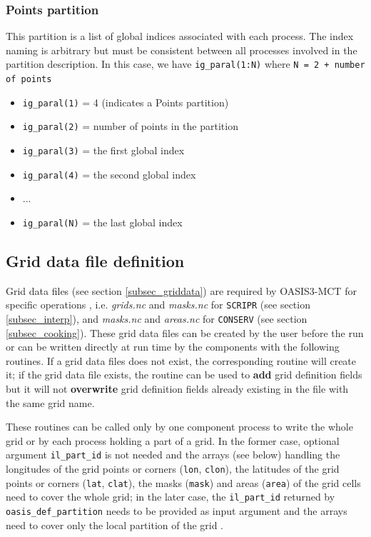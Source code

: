 \subsubsection{Points partition}

This partition is a list of global indices associated with each
process.  The index naming
is arbitrary but must be consistent between all processes involved
in the partition description.  In
this case, we have {\tt ig\_paral(1:N)} where {\tt N = 2 + number of
  points}

\begin{itemize}
\item {\tt ig\_paral(1)} = 4 (indicates a Points partition)
\item {\tt ig\_paral(2)} = number of points in the partition 
\item {\tt ig\_paral(3)} = the first global index
\item {\tt ig\_paral(4)} = the second global index
\item ...
\item {\tt ig\_paral(N)} = the last global index
\end{itemize}

\subsection{Grid data file definition}
\label{subsubsec_griddef}

Grid data files (see section \ref{subsec_griddata}) are required by OASIS3-MCT for specific operations , i.e.  {\em grids.nc} and {\em masks.nc} for
{\tt SCRIPR} (see section \ref{subsec_interp}), and {\em masks.nc} and
{\em areas.nc} for {\tt CONSERV} (see section
\ref{subsec_cooking}). These grid data files can be created by the
user before the run or can be written directly at run time by the components with the following routines.
If a grid data files does not exist, the corresponding routine will create it; if the grid data file exists, the routine can be used to {\bf add} grid definition fields but it will not {\bf overwrite} grid definition fields already existing in the file with the same grid name. 

These routines can be called only by one component process to write the whole grid or by each process holding a part of a grid. In the former case, optional argument {\tt il\_part\_id} is not needed and the arrays (see below) handling the longitudes of the grid points or corners ({\tt lon}, {\tt clon}), the latitudes of the grid points or corners ({\tt lat}, {\tt clat}), the masks ({\tt mask}) and areas ({\tt area}) of the grid cells need to cover the whole grid; in the later case, the {\tt il\_part\_id} returned by {\tt oasis\_def\_partition} needs to be provided as input argument and the arrays need to cover only the local partition of the grid .

